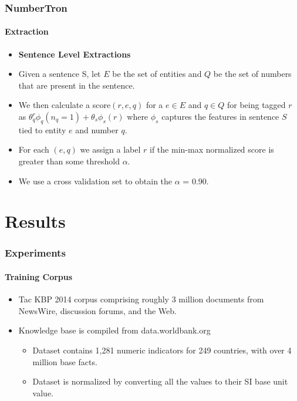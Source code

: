 \documentclass{beamer}
\begin{document}
\begin{frame}
\frametitle{NumberTron}
\framesubtitle{Extraction}
\begin{itemize}
 \item \textbf{Sentence Level Extractions}
 
\item Given a sentence S, let $E$ be the set of entities and $Q$ be the set of numbers that are present in the sentence.  
\item We then calculate a score$(r,e,q)$ for a $e \in E$ and $q \in Q$ for being tagged $r$ as $\theta^r_q \phi_q(n_q=1) + \theta_s \phi_s(r)$
where $\phi_s$ captures the features in sentence $S$ tied to entity $e$ and number $q$.
\item For each $(e,q)$ we assign a label $r$ if the min-max normalized score is greater than some threshold $\alpha$.
\item We use a cross validation set to obtain the $\alpha$ = 0.90.
\end{itemize}

\end{frame}


\section{Results}
\begin{frame}
\frametitle{Experiments}
\framesubtitle{Training Corpus}

\begin{itemize}
\item Tac KBP 2014 corpus comprising roughly 3 million documents from NewsWire, discussion forums, and the Web.
\item Knowledge base is compiled from data.worldbank.org
\begin{itemize}
\item Dataset contains 1,281 numeric indicators for 249 countries, with over 4 million base facts.
\item Dataset is normalized by converting all the values to their SI base unit value.
\end{itemize}
\end{itemize}

\end{frame}

\end{document}

